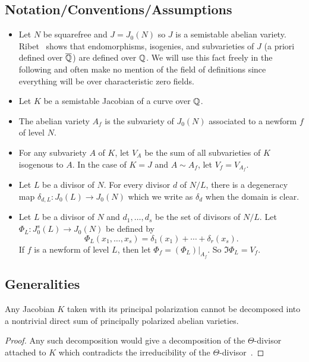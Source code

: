 \documentclass{article}
\begin{document}
\subsection{Notation/Conventions/Assumptions}
\begin{itemize}
    \item
        Let $N$ be squarefree and $J=J_0(N)$ so $J$ is a semistable abelian
        variety. Ribet~\cite[Corollary 1.4]{ribet:endo} shows that
        endomorphisms, isogenies, and subvarieties of $J$ (a priori defined
        over $\overline{\mathbb{Q}}$) are defined over $\mathbb{Q}$. We will use this fact freely in
        the following and often make no mention of the field of definitions
        since everything will be over characteristic zero fields.
    \item 
        Let $K$ be a semistable Jacobian of a curve over $\mathbb{Q}$.
    \item
        The abelian variety $A_f$ is the subvariety of $J_0(N)$ associated to a
        newform $f$ of level $N$.
    \item
        For any subvariety $A$ of $K$, let $V_A$ be the sum of all subvarieties
        of $K$ isogenous to $A$. In the case of $K=J$ and $A\sim A_f$, let $V_f =
        V_{A_f}$.
    \item
        Let $L$ be a divisor of $N$. For every divisor $d$ of $N/L$, there is a
        degeneracy map $\delta_{d,L}:J_0(L)\to J_0(N)$ which we write as
        $\delta_d$ when the domain is clear.
    \item
        Let $L$ be a divisor of $N$ and $d_1,\ldots,d_s$ be the set of divisors
        of $N/L$. Let $\Phi_L:J_0 ^s(L)\to J_0(N)$ be defined by
        \[
            \Phi_L(x_1,\ldots,x_s) = \delta_1(x_1)+\cdots+\delta_r(x_s).
        \] 
        If $f$ is a newform of level $L$, then let $\Phi_f = (\Phi_L)|_{A_f}$.
        So $\Im \Phi_L = V_f$.
\end{itemize}   


\subsection{Generalities}

\begin{theorem}
    \label{thm:theta_irred}
    Any Jacobian $K$ taken with its principal polarization cannot be decomposed
    into a nontrivial direct sum of principally polarized abelian varieties.
\end{theorem}
\begin{proof}
    Any such decomposition would give a decomposition of the $\Theta$-divisor
    attached to $K$ which contradicts the irreducibility of the
    $\Theta$-divisor~\cite[\S 4(a)]{MR0349687}.
\end{proof}
\end{document}
